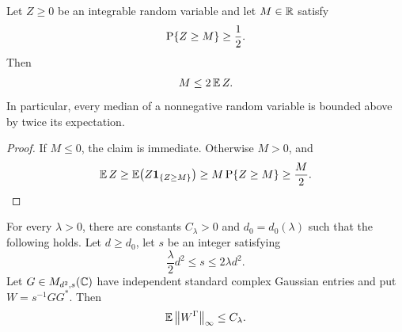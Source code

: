\begin{revlatest}
\begin{lemma}
\label{lem:appendixB-nonnegative-median-bound}
Let \(Z\ge0\) be an integrable random variable and let \(M\in\mathbb{R}\) satisfy
\[
  \operatorname{P}\{Z\ge M\}\ge \frac12 .
\]
Then
\[
  M\le 2\operatorname{\mathbb{E}} Z .
\]
In particular, every median of a nonnegative random variable is bounded above
by twice its expectation.
\end{lemma}

\begin{proof}
If \(M\le0\), the claim is immediate.  Otherwise \(M>0\), and
\[
  \operatorname{\mathbb{E}} Z
  \ge
  \operatorname{\mathbb{E}}\bigl(Z\mathbf 1_{\{Z\ge M\}}\bigr)
  \ge
  M\operatorname{P}\{Z\ge M\}
  \ge
  \frac M2 .
\]
\end{proof}
\end{revlatest}

\begin{proposition}
\label{prop:appendixB-wishart-expectation}
For every \(\lambda>0\), there are constants \(C_\lambda>0\) and
\(d_0=d_0(\lambda)\) such that the following holds.  Let \(d\ge d_0\), let
\(s\) be an integer satisfying
\[
  \frac{\lambda}{2}d^2\le s\le 2\lambda d^2 .
\]
Let \(G\in M_{d^2,s}(\mathbb{C})\) have independent standard complex Gaussian
entries and put \(W=s^{-1}GG^*\).  Then
\[
  \operatorname{\mathbb{E}}\left\lVert W^\Gamma\right\rVert_\infty\le C_\lambda .
\]
\end{proposition}

